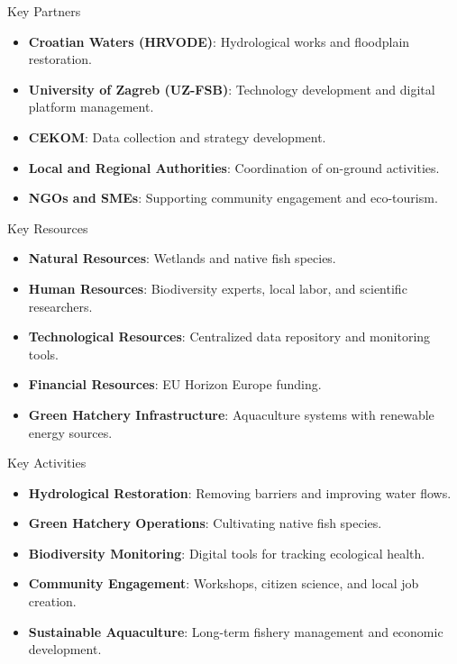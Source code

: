 \documentclass[
  ignorenonframetext,
]{beamer}
\providecommand{\tightlist}{%
  \setlength{\itemsep}{0pt}\setlength{\parskip}{0pt}}\usepackage{longtable,booktabs,array}
\begin{document}
\begin{frame}{Key Partners}
\label{key-partners}
\begin{itemize}
\tightlist
\item
  \textbf{Croatian Waters (HRVODE)}: Hydrological works and floodplain
  restoration.
\item
  \textbf{University of Zagreb (UZ-FSB)}: Technology development and
  digital platform management.
\item
  \textbf{CEKOM}: Data collection and strategy development.
\item
  \textbf{Local and Regional Authorities}: Coordination of on-ground
  activities.
\item
  \textbf{NGOs and SMEs}: Supporting community engagement and
  eco-tourism.
\end{itemize}
\end{frame}

\begin{frame}{Key Resources}
\label{key-resources}
\begin{itemize}
\tightlist
\item
  \textbf{Natural Resources}: Wetlands and native fish species.
\item
  \textbf{Human Resources}: Biodiversity experts, local labor, and
  scientific researchers.
\item
  \textbf{Technological Resources}: Centralized data repository and
  monitoring tools.
\item
  \textbf{Financial Resources}: EU Horizon Europe funding.
\item
  \textbf{Green Hatchery Infrastructure}: Aquaculture systems with
  renewable energy sources.
\end{itemize}
\end{frame}

\begin{frame}{Key Activities}
\label{key-activities}
\begin{itemize}
\tightlist
\item
  \textbf{Hydrological Restoration}: Removing barriers and improving
  water flows.
\item
  \textbf{Green Hatchery Operations}: Cultivating native fish species.
\item
  \textbf{Biodiversity Monitoring}: Digital tools for tracking
  ecological health.
\item
  \textbf{Community Engagement}: Workshops, citizen science, and local
  job creation.
\item
  \textbf{Sustainable Aquaculture}: Long-term fishery management and
  economic development.
\end{itemize}
\end{frame}
\end{document}
